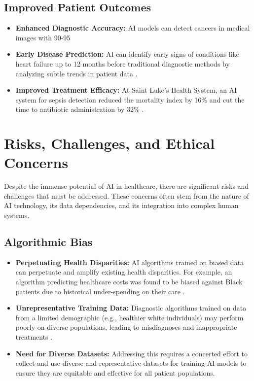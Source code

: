 \subsection{Improved Patient Outcomes}
\begin{itemize}
    \item \textbf{Enhanced Diagnostic Accuracy:} AI models can detect cancers in medical images with 90-95%
    \item \textbf{Early Disease Prediction:} AI can identify early signs of conditions like heart failure up to 12 months before traditional diagnostic methods by analyzing subtle trends in patient data \cite{ThoughtfulAI_AIBenefits}.
    \item \textbf{Improved Treatment Efficacy:} At Saint Luke's Health System, an AI system for sepsis detection reduced the mortality index by 16\% and cut the time to antibiotic administration by 32\% \cite{Forbes_AIBenefits}.
\end{itemize}

\section{Risks, Challenges, and Ethical Concerns}

Despite the immense potential of AI in healthcare, there are significant risks and challenges that must be addressed. These concerns often stem from the nature of AI technology, its data dependencies, and its integration into complex human systems.

\subsection{Algorithmic Bias}
\begin{itemize}
    \item \textbf{Perpetuating Health Disparities:} AI algorithms trained on biased data can perpetuate and amplify existing health disparities. For example, an algorithm predicting healthcare costs was found to be biased against Black patients due to historical under-spending on their care \cite{Paubox_AlgorithmicBias}.
    \item \textbf{Unrepresentative Training Data:} Diagnostic algorithms trained on data from a limited demographic (e.g., healthier white individuals) may perform poorly on diverse populations, leading to misdiagnoses and inappropriate treatments \cite{Inferscience_AlgorithmicBias}.
    \item \textbf{Need for Diverse Datasets:} Addressing this requires a concerted effort to collect and use diverse and representative datasets for training AI models to ensure they are equitable and effective for all patient populations.
\end{itemize}

